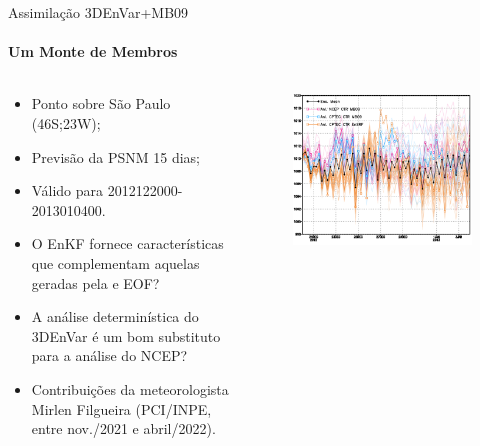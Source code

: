 \documentclass[10pt,aspectratio=169]{beamer}
\begin{document}
\begin{frame}{Assimilação 3DEnVar+MB09}
\framesubtitle{Um Monte de Membros}
	\begin{columns}[t]
    	\begin{column}{.5\textwidth}
   		    \vspace{-1.5em}
    		\begin{itemize}
        		\item Ponto sobre São Paulo (46S;23W);
        		\item Previsão da PSNM 15 dias;
        		\item Válido para 2012122000-2013010400.
    		\end{itemize}
    		\vspace{1em}
    		\begin{itemize}
				\item O EnKF fornece características que complementam aquelas geradas pela e EOF? 
				\item A análise determinística do 3DEnVar é um bom substituto para a análise do NCEP?
				\item Contribuições da meteorologista Mirlen Filgueira (PCI/INPE, entre nov./2021 e abril/2022).
			\end{itemize}
        \end{column}
        \begin{column}{.5\textwidth}
            \vspace{-2em}
			\begin{figure}[t]
			  \centering
			  \includegraphics[width=1.\linewidth]{./figs/spaguete71.png}
			\end{figure}
        \end{column}
    \end{columns}
\end{frame}
\end{document}
